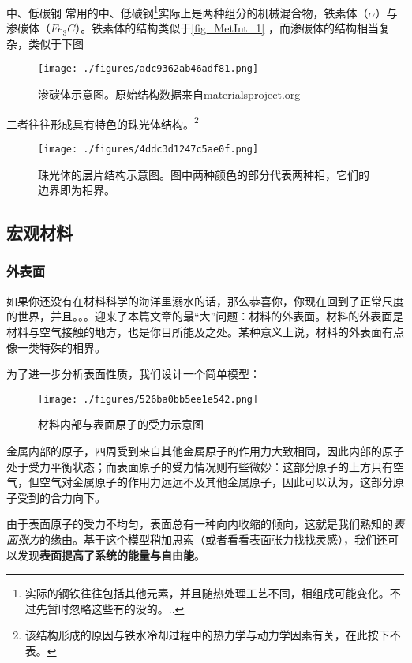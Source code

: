 \begin{example}{中、低碳钢}
常用的中、低碳钢\footnote{实际的钢铁往往包括其他元素，并且随热处理工艺不同，相组成可能变化。不过先暂时忽略这些有的没的。..}实际上是两种组分的机械混合物，铁素体（$\alpha$）与渗碳体（$Fe_3C$）。铁素体的结构类似于\autoref{fig_MetInt_1} ，而渗碳体的结构相当复杂，类似于下图
\begin{figure}[ht]
\centering
\texttt{[image: ./figures/adc9362ab46adf81.png]}
\caption{渗碳体示意图。原始结构数据来自materialsproject.org} \label{fig_MetInt_15}
\end{figure}
二者往往形成具有特色的珠光体结构。\footnote{该结构形成的原因与铁水冷却过程中的热力学与动力学因素有关，在此按下不表。}
\begin{figure}[ht]
\centering
\texttt{[image: ./figures/4ddc3d1247c5ae0f.png]}
\caption{珠光体的层片结构示意图。图中两种颜色的部分代表两种相，它们的边界即为相界。} \label{fig_MetInt_16}
\end{figure}
\end{example}

\subsection{宏观材料}\label{sub_MetInt_1}

\subsubsection{外表面}
如果你还没有在材料科学的海洋里溺水的话，那么恭喜你，你现在回到了正常尺度的世界，并且。。。迎来了本篇文章的最“大”问题：材料的外表面。材料的外表面是材料与空气接触的地方，也是你目所能及之处。某种意义上说，材料的外表面有点像一类特殊的相界。

为了进一步分析表面性质，我们设计一个简单模型：
\begin{figure}[ht]
\centering
\texttt{[image: ./figures/526ba0bb5ee1e542.png]}
\caption{材料内部与表面原子的受力示意图} \label{fig_MetInt_17}
\end{figure}
金属内部的原子，四周受到来自其他金属原子的作用力大致相同，因此内部的原子处于受力平衡状态；而表面原子的受力情况则有些微妙：这部分原子的上方只有空气，但空气对金属原子的作用力远远不及其他金属原子，因此可以认为，这部分原子受到的合力向下。

由于表面原子的受力不均匀，表面总有一种向内收缩的倾向，这就是我们熟知的\textsl{表面张力}的缘由。基于这个模型稍加思索（或者看看表面张力找找灵感），我们还可以发现\textbf{表面提高了系统的能量与自由能}。

